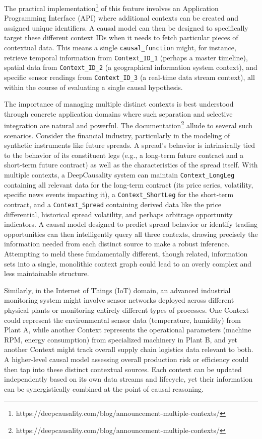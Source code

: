 The practical implementation\footnote{https://deepcausality.com/blog/announcement-multiple-contexts/} of this feature involves an Application Programming Interface (API) where additional contexts can be created and assigned unique identifiers. A causal model can then be designed to specifically target these different context IDs when it needs to fetch particular pieces of contextual data. This means a single \texttt{causal\_function} might, for instance, retrieve temporal information from \texttt{Context\_ID\_1} (perhaps a master timeline), spatial data from \texttt{Context\_ID\_2} (a geographical information system context), and specific sensor readings from \texttt{Context\_ID\_3} (a real-time data stream context), all within the course of evaluating a single causal hypothesis.

The importance of managing multiple distinct contexts is best understood through concrete application domains where such separation and selective integration are natural and powerful. The documentation\footnote{https://deepcausality.com/blog/announcement-multiple-contexts/} allude to several such scenarios. Consider the financial industry, particularly in the modeling of synthetic instruments like future spreads. A spread's behavior is intrinsically tied to the behavior of its constituent legs (e.g., a long-term future contract and a short-term future contract) as well as the characteristics of the spread itself. With multiple contexts, a DeepCausality system can maintain \texttt{Context\_LongLeg} containing all relevant data for the long-term contract (its price series, volatility, specific news events impacting it), a \texttt{Context\_ShortLeg} for the short-term contract, and a \texttt{Context\_Spread} containing derived data like the price differential, historical spread volatility, and perhaps arbitrage opportunity indicators. A causal model designed to predict spread behavior or identify trading opportunities can then intelligently query all three contexts, drawing precisely the information needed from each distinct source to make a robust inference. Attempting to meld these fundamentally different, though related, information sets into a single, monolithic context graph could lead to an overly complex and less maintainable structure.

Similarly, in the Internet of Things (IoT) domain, an advanced industrial monitoring system might involve sensor networks deployed across different physical plants or monitoring entirely different types of processes. One Context could represent the environmental sensor data (temperature, humidity) from Plant A, while another Context represents the operational parameters (machine RPM, energy consumption) from specialized machinery in Plant B, and yet another Context might track overall supply chain logistics data relevant to both. A higher-level causal model assessing overall production risk or efficiency could then tap into these distinct contextual sources. Each context can be updated independently based on its own data streams and lifecycle, yet their information can be synergistically combined at the point of causal reasoning.

